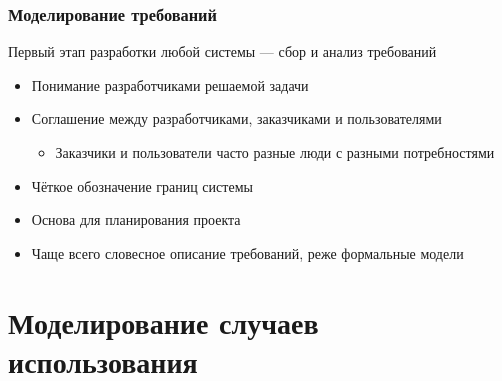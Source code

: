 \documentclass{../../slides-style}
\begin{document}
    \begin{frame}
        \frametitle{Моделирование требований}
        Первый этап разработки любой системы --- сбор и анализ требований
        \begin{itemize}
            \item Понимание разработчиками решаемой задачи
            \item Соглашение между разработчиками, заказчиками и пользователями
            \begin{itemize}
                \item Заказчики и пользователи часто разные люди с разными потребностями
            \end{itemize}
            \item Чёткое обозначение границ системы
            \item Основа для планирования проекта
            \item Чаще всего словесное описание требований, реже формальные модели
        \end{itemize}
    \end{frame}

    \section{Моделирование случаев использования}
    
\end{document}
